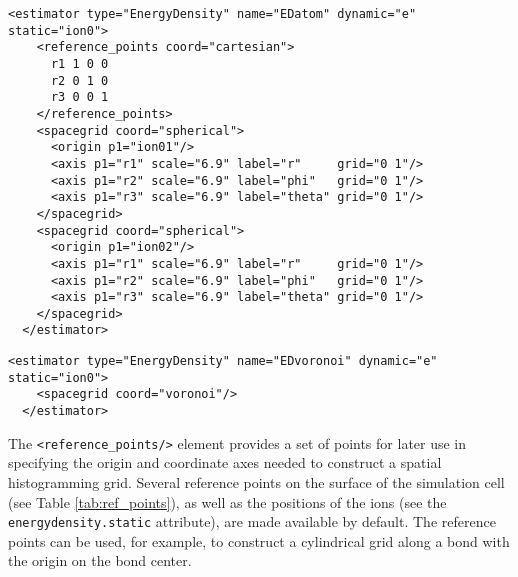 \begin{lstlisting}[style=QMCPXML,caption=Energy density estimator accumulated within spheres of radius 6.9 Bohr centered on the first and second atoms in the ion0 particleset.]
  <estimator type="EnergyDensity" name="EDatom" dynamic="e" static="ion0">
    <reference_points coord="cartesian">
      r1 1 0 0 
      r2 0 1 0
      r3 0 0 1
    </reference_points>
    <spacegrid coord="spherical">
      <origin p1="ion01"/>
      <axis p1="r1" scale="6.9" label="r"     grid="0 1"/>
      <axis p1="r2" scale="6.9" label="phi"   grid="0 1"/>
      <axis p1="r3" scale="6.9" label="theta" grid="0 1"/>
    </spacegrid>
    <spacegrid coord="spherical">
      <origin p1="ion02"/>
      <axis p1="r1" scale="6.9" label="r"     grid="0 1"/>
      <axis p1="r2" scale="6.9" label="phi"   grid="0 1"/>
      <axis p1="r3" scale="6.9" label="theta" grid="0 1"/>
    </spacegrid>
  </estimator>
\end{lstlisting}


\begin{lstlisting}[style=QMCPXML,caption=Energy density estimator accumulated within Voronoi polyhedra centered on the ions.]
  <estimator type="EnergyDensity" name="EDvoronoi" dynamic="e" static="ion0">
    <spacegrid coord="voronoi"/>
  </estimator>
\end{lstlisting}



The \texttt{<reference\_points/>} element provides a set of points for later use in specifying the origin and coordinate axes needed to construct a spatial histogramming grid.  Several reference points on the surface of the simulation cell (see Table \ref{tab:ref_points}), as well as the positions of the ions (see the \texttt{energydensity.static} attribute), are made available by default.  The reference points can be used, for example, to construct a cylindrical grid along a bond with the origin on the bond center. 

